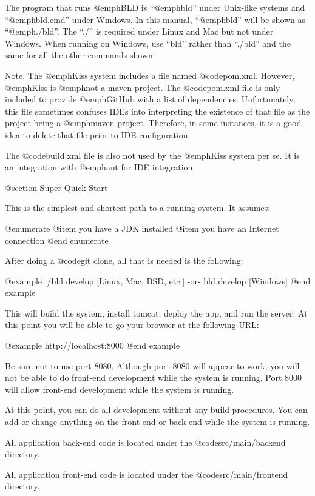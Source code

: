 The program that runs @emph{BLD} is ``@emph{bld}'' under Unix-like
systems and ``@emph{bld.cmd}'' under Windows.  In this manual,
``@emph{bld}'' will be shown as ``@emph{./bld}''.  The ``./'' is
required under Linux and Mac but not under Windows.  When running on
Windows, use ``bld'' rather than ``./bld'' and the same for all the
other commands shown.

Note.  The @emph{Kiss} system includes a file named @code{pom.xml}.
However, @emph{Kiss} is @emph{not} a maven project.  The
@code{pom.xml} file is only included to provide @emph{GitHub} with a
list of dependencies.  Unfortunately, this file sometimes confuses IDEs
into interpreting the existence of that file as the project being a
@emph{maven} project.  Therefore, in some instances, it is a good idea
to delete that file prior to IDE configuration.

The @code{build.xml} file is also not used by the @emph{Kiss} system per se.
It is an integration with @emph{ant} for IDE integration.


@section Super-Quick-Start

This is the simplest and shortest path to a running system.  It assumes:

@enumerate
@item
you have a JDK installed
@item
you have an Internet connection
@end enumerate

After doing a @code{git clone}, all that is needed is the following:

@example
    ./bld  develop                      [Linux, Mac, BSD, etc.]
         -or-
    bld  develop                        [Windows]
@end example

This will build the system, install tomcat, deploy the app, and run
the server.  At this point you will be able to go your browser at the
following URL:

@example
    http://localhost:8000
@end example

Be sure not to use port 8080.  Although port 8080 will appear to work,
you will not be able to do front-end development while the system is
running.  Port 8000 will allow front-end development while the system
is running.

At this point, you can do all development without any build
procedures.  You can add or change anything on the front-end or
back-end while the system is running.

All application back-end code is located under the @code{src/main/backend}
directory.

All application front-end code is located under the @code{src/main/frontend}
directory.


